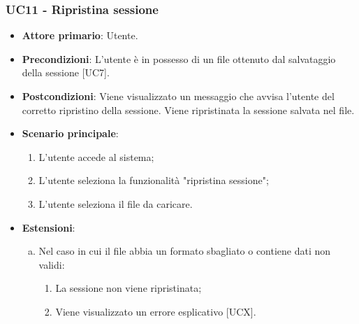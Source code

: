 \subsubsection{UC11 - Ripristina sessione}
\begin{itemize}
	\item \textbf{Attore primario}: Utente.
	\item \textbf{Precondizioni}: L'utente è in possesso di un file  ottenuto dal salvataggio della sessione [UC7].
	\item \textbf{Postcondizioni}: Viene visualizzato un messaggio che avvisa l'utente del corretto ripristino della sessione. Viene ripristinata la sessione salvata nel file.
	\item \textbf{Scenario principale}:
		\begin{enumerate}
			\item L'utente accede al sistema;
			\item L'utente seleziona la funzionalità "ripristina sessione";
			\item L'utente seleziona il file da caricare.
		\end{enumerate}
	\item \textbf{Estensioni}:
	\begin{enumerate}[(a)]
		\item Nel caso in cui il file abbia un formato sbagliato o contiene dati non validi:
		\begin{enumerate}[1.]
			\item La sessione non viene ripristinata;
			\item Viene visualizzato un errore esplicativo [UCX].
		\end{enumerate}
	\end{enumerate}
\end{itemize}